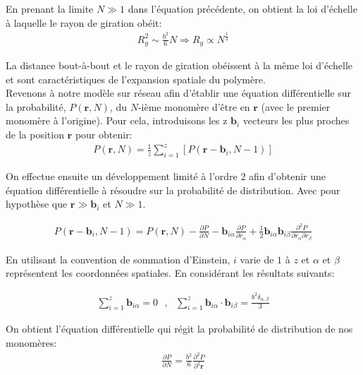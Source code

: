 En prenant la limite $N \gg 1$ dans l'équation précédente, on obtient la loi d'échelle à laquelle le rayon de giration obéit:
\begin{eqnarray}
R_g^2\text{}\sim\text{}\frac{b^2}{6}N \Rightarrow R_g\propto N^{\frac12}
\end{eqnarray}

La distance bout-à-bout et le rayon de giration obéissent à la même loi d'échelle et sont caractéristiques de l'expansion spatiale du polymère.\\


Revenons à notre modèle sur réseau afin d'établir une équation différentielle sur la probabilité, $P(\textbf{r},N)$, du $N$-ième monomère d'être en $\textbf{r}$ (avec le premier monomère à l'origine). Pour cela, introduisons les z $\textbf{b}_i$  vecteurs les plus proches de la position $\textbf{r}$ pour obtenir:
\begin{eqnarray}
P(\textbf{r},N)= \frac{1}{z}\sum_{i=1}^{z} \left[P(\textbf{r}-\textbf{b}_i,N-1)\right]
\label{eqdifprob}
\end{eqnarray}

On effectue ensuite un développement limité à l'ordre 2 afin d'obtenir une équation différentielle à résoudre sur la probabilité de distribution. Avec pour hypothèse que $\textbf{r}\gg\textbf{b}_i$ et $N \gg 1$.

\begin{eqnarray}
P(\textbf{r}-\textbf{b}_i,N-1)=P(\textbf{r},N)- \frac{\partial P}{\partial N}-  \textbf{b}_{i\alpha} \frac{\partial P}{\partial r_{\alpha} } + \frac12 \textbf{b}_{i\alpha}\textbf{b}_{i\beta} \frac{\partial ^2 P}{\partial r_{\alpha}\partial r_{\beta} }
\end{eqnarray}

En utilisant la convention de sommation d'Einstein, $i$ varie de $1$ à $z$ et $\alpha$ et $\beta$ représentent les coordonnées spatiales. En considérant les résultats suivants:

\begin{eqnarray}
\sum_{i=1}^{z}\textbf{b}_{i\alpha}=0 \text{ },\text{ } \sum_{i=1}^{z}\textbf{b}_{i\alpha}\cdot\textbf{b}_{i\beta} = \frac{b^2\delta_{\alpha,\beta}}{3}
\end{eqnarray}

On obtient l'équation différentielle qui régit la probabilité de distribution de nos monomères:
\begin{eqnarray}
 \frac{\partial P}{\partial N} =   \frac{b^2}{6}\frac{\partial ^2 P}{\partial ^2 \textbf{r}}
 \label{eqdif}
\end{eqnarray}

